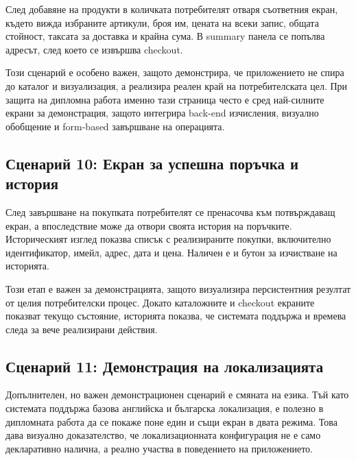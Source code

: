 След добавяне на продукти в количката потребителят отваря съответния екран, където вижда избраните артикули, броя им, цената на всеки запис, общата стойност, таксата за доставка и крайна сума. В summary панела се попълва адресът, след което се извършва checkout.

Този сценарий е особено важен, защото демонстрира, че приложението не спира до каталог и визуализация, а реализира реален край на потребителската цел. При защита на дипломна работа именно тази страница често е сред най-силните екрани за демонстрация, защото интегрира back-end изчисления, визуално обобщение и form-based завършване на операцията.


\subsection{Сценарий 10: Екран за успешна поръчка и история}

След завършване на покупката потребителят се пренасочва към потвърждаващ екран, а впоследствие може да отвори своята история на поръчките. Историческият изглед показва списък с реализираните покупки, включително идентификатор, имейл, адрес, дата и цена. Наличен е и бутон за изчистване на историята.

Този етап е важен за демонстрацията, защото визуализира персистентния резултат от целия потребителски процес. Докато каталожните и checkout екраните показват текущо състояние, историята показва, че системата поддържа и времева следа за вече реализирани действия.


\subsection{Сценарий 11: Демонстрация на локализацията}

Допълнителен, но важен демонстрационен сценарий е смяната на езика. Тъй като системата поддържа базова английска и българска локализация, е полезно в дипломната работа да се покаже поне един и същи екран в двата режима. Това дава визуално доказателство, че локализационната конфигурация не е само декларативно налична, а реално участва в поведението на приложението.

